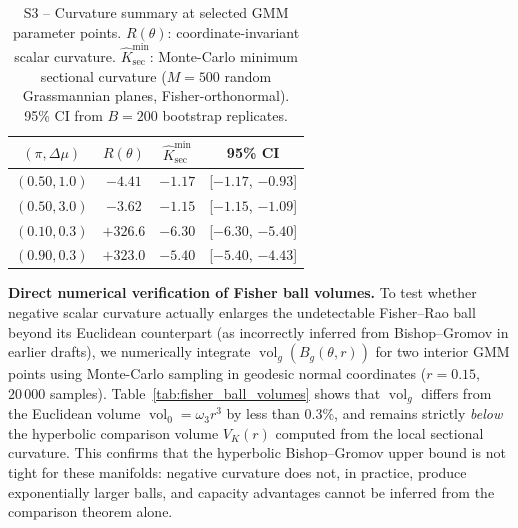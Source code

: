 \documentclass[a4paper,fleqn]{cas-dc}
\DeclareMathOperator{\vol}{vol}
\begin{document}
\begin{table}[ht]
  \centering
  \caption{S3 -- Curvature summary at selected GMM parameter points.
    $R(\theta)$: coordinate-invariant scalar curvature.
    $\widehat{K}_{\sec}^{\min}$: Monte-Carlo minimum sectional curvature
    ($M=500$ random Grassmannian planes, Fisher-orthonormal).
    95\% CI from $B=200$ bootstrap replicates.}
  \label{tab:s3revised}
  \begin{tabular}{cccc}
    \toprule
    $(\pi, \Delta\mu)$ & $R(\theta)$ & $\widehat{K}_{\sec}^{\min}$ & 95\% CI \\
    \midrule
    $(0.50, 1.0)$ & $-4.41$ & $-1.17$ & [$-1.17$, $-0.93$] \\
    $(0.50, 3.0)$ & $-3.62$ & $-1.15$ & [$-1.15$, $-1.09$] \\
    $(0.10, 0.3)$ & $+326.6$ & $-6.30$ & [$-6.30$, $-5.40$] \\
    $(0.90, 0.3)$ & $+323.0$ & $-5.40$ & [$-5.40$, $-4.43$] \\
    \bottomrule
  \end{tabular}
\end{table}

\noindent\textbf{Direct numerical verification of Fisher ball volumes.}
To test whether negative scalar curvature actually enlarges the
undetectable Fisher--Rao ball beyond its Euclidean counterpart
(as incorrectly inferred from Bishop--Gromov in earlier drafts),
we numerically integrate $\vol_g(B_g(\theta,r))$ for two interior
GMM points using Monte-Carlo sampling in geodesic normal coordinates
($r=0.15$, $20\,000$ samples).
Table~\ref{tab:fisher_ball_volumes} shows that $\vol_g$ differs from
the Euclidean volume $\vol_0 = \omega_3 r^3$ by less than $0.3\%$,
and remains strictly \emph{below} the hyperbolic comparison volume
$V_K(r)$ computed from the local sectional curvature.
This confirms that the hyperbolic Bishop--Gromov upper bound is not
tight for these manifolds: negative curvature does not, in practice,
produce exponentially larger balls, and capacity advantages cannot
be inferred from the comparison theorem alone.
\end{document}
